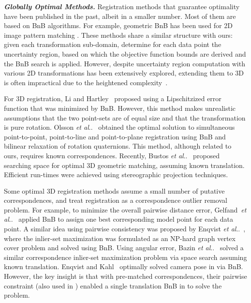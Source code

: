 \documentclass[10pt,journal,cspaper,compsoc]{IEEEtran}
\makeatletter
\DeclareRobustCommand\onedot{\futurelet\@let@token\@onedot}
\def\@onedot{\ifx\@let@token.\else.\null\fi\xspace}
\def\etal{\emph{et al}\onedot}
\makeatother
\begin{document}
\vspace{0.06in}
\noindent\textbf{\emph{{Globally Optimal Methods.}}}
Registration methods that guarantee optimality have been published in the past, albeit in a smaller number. Most of them are based on BnB algorithms. For example, geometric BnB has been used for 2D image pattern matching \cite{breuel2003implementation,mount1999efficient,pfeuffer2012discrete}. These methods share a similar structure with ours: given each transformation sub-domain, determine for each data point the uncertainty region, based on which the objective function bounds are derived and the BnB search is applied. However, despite uncertainty region computation with various 2D transformations has been extensively explored, extending them to 3D is often impractical due to the heightened complexity~\cite{breuel2003implementation}.

For 3D registration, Li and Hartley~\cite{li20073d} proposed using a Lipschitzized  error function that was minimized by BnB. However, this method makes unrealistic assumptions that the two point-sets are of equal size and that the transformation is pure rotation. Olsson \etal~\cite{olsson2009branch} obtained the optimal solution to simultaneous point-to-point, point-to-line and point-to-plane registration using BnB and bilinear relaxation of rotation quaternions. This method, although related to ours, requires known correspondences. Recently, Bustos \etal~\cite{bustos2014fast} proposed searching  space for optimal 3D geometric matching, assuming known translation. Efficient run-times were achieved using stereographic projection techniques.

Some optimal 3D registration methods assume a small number of putative correspondences, and treat registration as a correspondence outlier removal problem. For example, to minimize the overall pairwise distance error, Gelfand~\etal~\cite{gelfand2005robust} applied BnB to assign one best corresponding model point for each data point. A similar idea using pairwise consistency was proposed by Enqvist \etal~\cite{enqvist2009optimal}, where the inlier-set maximization was formulated as an NP-hard graph vertex cover problem and solved using BnB. Using angular error, Bazin \etal~\cite{bazin2012globally} solved a similar correspondence inlier-set maximization problem via  space search assuming known translation. Enqvist and Kahl~\cite{enqvist2008robust} optimally solved camera pose in  via BnB. However, the key insight is that with pre-matched correspondences, their pairwise constraint (also used in \cite{enqvist2009optimal}) enabled a single translation BnB in  to solve the  problem.
\end{document}
